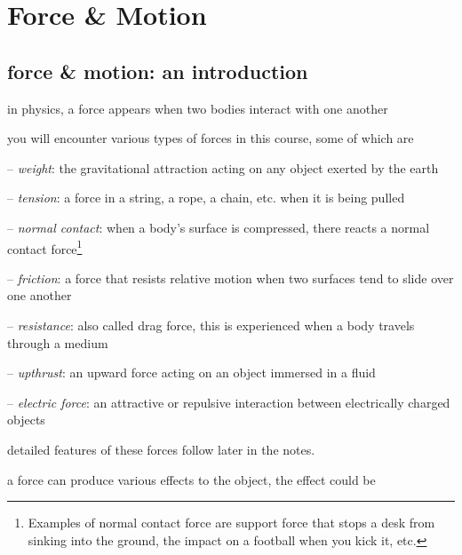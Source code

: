 \section{Force \& Motion}

\subsection{force \& motion: an introduction}

in physics, a force appears when two bodies interact with one another

\cmt you will encounter various types of forces in this course, some of which are

\begin{compactitem}
	\item[--] \emph{weight}: the gravitational attraction acting on any object exerted by the earth
	
	\item[--] \emph{tension}: a force in a string, a rope, a chain, etc. when it is being pulled
	
	\item[--] \emph{normal contact}: when a body's surface is compressed, there reacts a normal contact force\footnote{Examples of normal contact force are support force that stops a desk from sinking into the ground, the impact on a football when you kick it, etc.}
	
	\item[--] \emph{friction}: a force that resists relative motion when two surfaces tend to slide over one another
	
	\item[--] \emph{resistance}: also called drag force, this is experienced when a body travels through a medium

	
	\item[--] \emph{upthrust}: an upward force acting on an object immersed in a fluid
	
	\item[--] \emph{electric force}: an attractive or repulsive interaction between electrically charged objects
	
\end{compactitem}

detailed features of these forces follow later in the notes.

\cmt a force can produce various effects to the object, the effect could be

